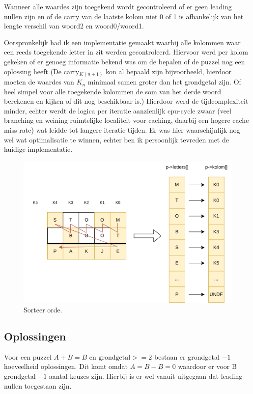 \documentclass[twocolumn,10pt]{article}
\begin{document}
Wanneer alle waardes zijn toegekend wordt gecontroleerd of er geen leading nullen zijn en of de carry van de laatste kolom niet 0 of 1 is afhankelijk van het lengte verschil van woord2 en woord0/woord1.

Oorspronkelijk had ik een implementatie gemaakt waarbij alle kolommen waar een reeds toegekende letter in zit werden gecontroleerd. Hiervoor werd per kolom gekeken of er genoeg informatie bekend was om de bepalen of de puzzel nog een oplossing heeft (De carry$_{K(n+1)}$ kon al bepaald zijn bijvoorbeeld, hierdoor moeten de waardes van $K_n$ minimaal samen groter dan het grondgetal zijn. Of heel simpel voor alle toegekende kolommen de som van het derde woord berekenen en kijken of dit nog beschikbaar is.) Hierdoor werd de tijdcomplexiteit minder, echter werdt de logica per iteratie aanzienlijk cpu-cycle zwaar (veel branching en weining ruimtelijke localiteit voor caching, daarbij een hogere cache miss rate) wat leidde tot langere iteratie tijden. Er was hier waarschijnlijk nog wel wat optimalisatie te winnen, echter ben ik persoonlijk tevreden met de huidige implementatie.

\begin{figure}[H]
    \centering
    \includegraphics[width=1.0\columnwidth]{letter.png}
        \caption{Sorteer orde.}
    \end{figure}
    \hfill


\subsection*{Oplossingen}
Voor een puzzel $A+B=B$ en $\text{grondgetal} >= 2$ bestaan er grondgetal $- 1$ hoeveelheid oplossingen. Dit komt omdat $A=B-B=0$ waardoor er voor B grondgetal $- 1$ aantal keuzes zijn. Hierbij is er wel vanuit uitgegaan dat leading nullen toegestaan zijn.
\end{document}
